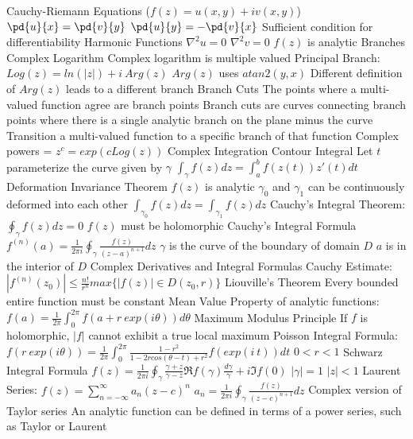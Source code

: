 \documentclass[14pt]{extarticle}
\begin{document}
\begin{outline}
		\1	Cauchy-Riemann Equations ($f(z) = u(x,y) + iv(x,y)$)
			\2	$\pd{u}{x} = \pd{v}{y}$
			\2	$\pd{u}{y} = -\pd{v}{x}$
			\2	Sufficient condition for differentiability
			\2	Harmonic Functions
				\3	$\nabla^2u = 0$
				\3	$\nabla^2v = 0$
				\3	$f(z)$ is analytic 	
		\1	Branches
			\2	Complex Logarithm
				\3	Complex logarithm is multiple valued
				\3	Principal Branch: $Log(z) = ln(|z|) + i~Arg(z)$
					\4	$Arg(z)$ uses $atan2(y,x)$
					\4	Different definition of $Arg(z)$ leads to a different branch
				\3	Branch Cuts
					\4	The points where a multi-valued function agree are branch points
					\4	Branch cuts are curves connecting branch points where there is
							a single analytic branch on the plane minus the curve
					\4	Transition a multi-valued function to a specific branch of that
							function
			\2	Complex powers = $z^c = exp(c Log(z))$	
		\1	Complex Integration
			\2	Contour Integral
				\3	Let $t$ parameterize the curve given by $\gamma$
				\3	$\int_{\gamma} f(z) dz = \int_a^b f(z(t))z'(t) dt$
			\2	Deformation Invariance Theorem
				\3	$f(z)$ is analytic 
				\3	$\gamma_0$ and $\gamma_1$ can be continuously deformed into each other
				\3	$\int_{\gamma_0} f(z)dz = \int_{\gamma_1} f(z) dz$
			\2	Cauchy's Integral Theorem: $\oint_{\gamma} f(z) dz = 0$
				\3	$f(z)$ must be holomorphic
			\2	Cauchy's Integral Formula
				\3	$f^{(n)}(a) = \frac{1}{2 \pi i} \oint_{\gamma} \frac{f(z)}{(z - a)^{n+1}}dz$
				\3	$\gamma$ is the curve of the boundary of domain $D$
				\3	$a$ is in the interior of $D$
		\1	Complex Derivatives and Integral Formulas
			\2	Cauchy Estimate: $|f^{(n)}(z_0)| \le \frac{n!}{r^n}max\{|f(z)| \in D(z_0,r)\}$	
			\2	Liouville's Theorem
				\3	Every bounded entire function must be constant
			\2	Mean Value Property of analytic functions: $f(a) = \frac{1}{2 \pi}\int_0^{2\pi} f(a + r~exp(i\theta))d\theta$
			\2	Maximum Modulus Principle
				\3	If $f$ is holomorphic, $|f|$ cannot exhibit a true local maximum
			\2	Poisson Integral Formula:	
				\3$f(r~exp(i\theta)) = \frac{1}{2\pi}\int_0^{2\pi} \frac{1 - r^2}{1 - 2rcos(\theta - t) + r^2} f(exp(i~t)) dt$
				\3 $0<r<1$
			\2	Schwarz Integral Formula
				\3	$f(z) = \frac{1}{2\pi i} \oint_{\gamma} \frac{\gamma + z}{\gamma - z}\Re{f(\gamma)} \frac{d\gamma}{\gamma} + i \Im{f(0)}$
				\3	$|\gamma| = 1$
				\3	$|z| < 1$
			\2	Laurent Series: $f(z) = \sum_{n=-\infty}^{\infty} a_n (z - c)^n$
				\3	$a_n = \frac{1}{2\pi i} \oint_{\gamma} \frac{f(z)}{(z - c)^{n+1}}dz$
				\3	Complex version of Taylor series
				\3	An analytic function can be defined in terms of a power series, such as Taylor or Laurent

\end{outline}
\end{document}
